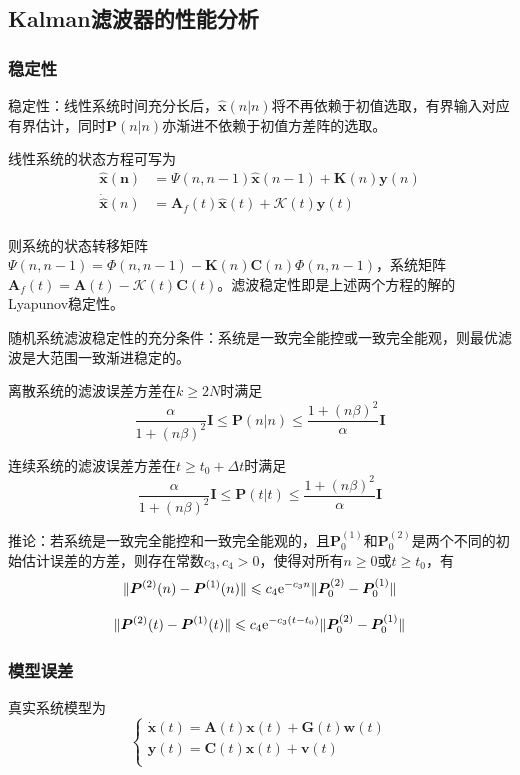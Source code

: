 \documentclass[11pt,a4paper]{ctexart}
\newcommand{\e}{{\rm e}}
\begin{document}
    \subsection{Kalman滤波器的性能分析}
        \subsubsection{稳定性}
            稳定性：线性系统时间充分长后，$\bm{\hat x}(n|n)$将不再依赖于初值选取，有界输入对应有界估计，同时$\bm P(n|n)$亦渐进不依赖于初值方差阵的选取。
            
            线性系统的状态方程可写为
            \begin{align*}
            \bm{\hat x(n)}&=\bm\varPsi(n,n-1)\bm{\hat x}(n-1)+\bm K(n)\bm y(n)\\
            \bm{\dot{\hat x}}(n)&=\bm A_f(t)\bm{\hat x}(t)+\mathscr{K}(t)\bm y(t)\\
            \end{align*}

            则系统的状态转移矩阵$\bm\varPsi(n,n-1)=\bm\varPhi(n,n-1)-\bm K(n)\bm C(n)\bm\varPhi(n,n-1)$，系统矩阵$\bm A_f(t)=\bm A(t)-\mathscr{K}(t)\bm C(t)$。滤波稳定性即是上述两个方程的解的Lyapunov稳定性。

            随机系统滤波稳定性的充分条件：系统是一致完全能控或一致完全能观，则最优滤波是大范围一致渐进稳定的。

            离散系统的滤波误差方差在$k\geqslant 2N$时满足
            \[
            \frac{\alpha}{1+(n\beta)^2}\bm I\leqslant\bm P(n|n)\leqslant\frac{1+(n\beta)^2}{\alpha}\bm I
            \]

            连续系统的滤波误差方差在$t\geqslant t_0+\Delta t$时满足
            \[
            \frac{\alpha}{1+(n\beta)^2}\bm I\leqslant\bm P(t|t)\leqslant\frac{1+(n\beta)^2}{\alpha}\bm I
            \]

            推论：若系统是一致完全能控和一致完全能观的，且$\bm P_0^{(1)}$和$\bm P_0^{(2)}$是两个不同的初始估计误差的方差，则存在常数$c_3,c_4>0$，使得对所有$n\geqslant0$或$t\geqslant t_0$，有
            \[
            \|\bm P^{(2)}(n)-\bm P^{(1)}(n)\|\leqslant c_4\e^{-c_3n}\|\bm P_0^{(2)}-\bm P_0^{(1)}\|
            \]

            \[
            \|\bm P^{(2)}(t)-\bm P^{(1)}(t)\|\leqslant c_4\e^{-c_3(t-t_0)}\|\bm P_0^{(2)}-\bm P_0^{(1)}\|
            \]
        \subsubsection{模型误差}
            真实系统模型为
            \[\begin{cases}
            \bm{\dot x}(t)=\bm{A}(t)\bm{x}(t)+\bm{G}(t)\bm{w}(t)\\
            \bm{y}(t)=\bm{C}(t)\bm{x}(t)+\bm{v}(t)\\
            \end{cases}\]
            
\end{document}
